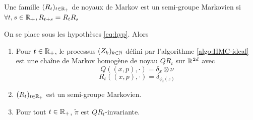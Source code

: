 \documentclass[10pt,a4paper]{article}
\begin{document}
\begin{Def}
	Une famille $(R_t)_{t \in \mathbb{R}_+}$ de noyaux de Markov est un semi-groupe Markovien si $\forall t,s \in \mathbb{R}_+, R_{t+s} = R_t R_s$
\end{Def}

\begin{Prop}\label{prop:inv-ideal}
	On se place sous les hypothèses \eqref{eq:hyp}. Alors

	\begin{enumerate}
		\item Pour $t \in \mathbb{R}_+$, le processus $(Z_k)_{k \in \mathbb{N}}$ défini par l'algorithme \ref{algo:HMC-ideal} est une chaîne de Markov homogène de noyau $QR_t$ sur $\mathbb{R}^{2d}$ avec
		$$
		Q((x,p),\cdot) = \delta_x \otimes \nu
		$$
		$$
		R_t((x,p),\cdot) = \delta_{\phi_t(z)}
		$$
		\item $(R_t)_{t \in \mathbb{R}_+}$ est un semi-groupe Markovien.
		\item Pour tout $t \in \mathbb{R}_+$, $\widetilde{\pi}$ est $QR_t$-invariante. 
	\end{enumerate}
\end{Prop}
\end{document}
